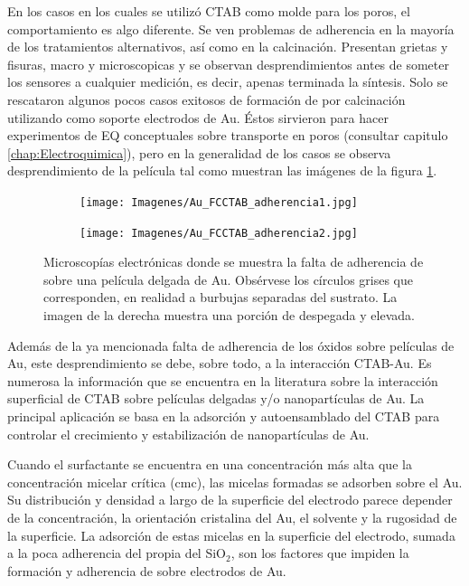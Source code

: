 			En los casos en los cuales se utilizó CTAB como molde para los poros, el comportamiento es algo diferente. Se ven problemas de adherencia en la mayoría de los tratamientos alternativos, así como en la calcinación. Presentan grietas y fisuras, macro y microscopicas y se observan desprendimientos antes de someter los sensores a cualquier medición, es decir, apenas terminada la síntesis. Solo se rescataron algunos pocos casos exitosos de formación de \pdmC\space por calcinación utilizando como soporte electrodos de Au. Éstos sirvieron para hacer experimentos de EQ conceptuales sobre transporte en poros (consultar capitulo \ref{chap:Electroquimica}), pero en la generalidad de los casos se observa desprendimiento de la película tal como muestran las imágenes de la figura \ref{fig:CTAB_adherencia}.
	     
				\begin{figure}[th]
		 	   	    \begin{subfigure}[t]{0.49\textwidth}
			        	\texttt{[image: Imagenes/Au\_FCCTAB\_adherencia1.jpg]}
			       		\end{subfigure}
					\begin{subfigure}[t]{0.49\textwidth}
			 	   	    \texttt{[image: Imagenes/Au\_FCCTAB\_adherencia2.jpg]}
			       		\end{subfigure}
					 \caption[Adherencia de CTAB sobre electrodos.]{Microscopías electrónicas donde se muestra la falta de adherencia de \pdmC\space sobre una película delgada de Au. Obsérvese los círculos grises que corresponden, en realidad a burbujas separadas del sustrato. La imagen de la derecha muestra una porción de \pdmC\space despegada y elevada.}
					 \label{fig:CTAB_adherencia}	
				     \end{figure}
			
			Además de la ya mencionada falta de adherencia de los óxidos sobre películas de Au, este desprendimiento se debe, sobre todo, a la interacción CTAB-Au. Es numerosa la información que se encuentra en la literatura sobre la interacción superficial de CTAB sobre películas delgadas y/o nanopartículas de Au. La principal aplicación se basa en la adsorción y autoensamblado del CTAB para controlar el crecimiento y estabilización de nanopartículas de Au. \cite{Cheng2003,Smith2008,Lim2014,Meena2013,Wang2013,Hamon2009}

			Cuando el surfactante se encuentra en una concentración más alta que la concentración micelar crítica (cmc), las micelas formadas se adsorben sobre el Au. Su distribución y densidad a largo de la superficie del electrodo parece depender de la concentración, la orientación cristalina del Au, el solvente y la rugosidad de la superficie\cite{Meena2013,Lim2014}. La adsorción de estas micelas en la superficie del electrodo, sumada a la poca adherencia del propia del SiO$_2$, son los factores que impiden la formación y adherencia de \pdmC\space sobre electrodos de Au.
									
